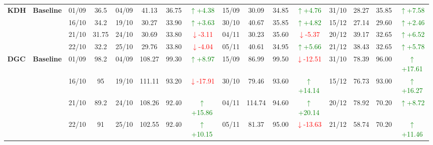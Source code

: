 \documentclass{ieeeaccess}
\begin{document}
{\begin{longtable}{llcc|cccc|cccc|cccc}
\multirow{4}{*}{\textbf{KDH}}
& \textbf{Baseline}
& 01/09 & 36.5 & 04/09 & 41.13 & 36.75 & \textcolor{green}{\(\uparrow\)+4.38} & 15/09 & 30.09 & 34.85 & \textcolor{green}{\(\uparrow\)+4.76} & 31/10 & 28.27 & 35.85 & \textcolor{green}{\(\uparrow\)+7.58} \\
& & 16/10 & 34.2 & 19/10 & 30.27 & 33.90 & \textcolor{green}{\(\uparrow\)+3.63} & 30/10 & 40.67 & 35.85 & \textcolor{green}{\(\uparrow\)+4.82} & 15/12 & 27.14 & 29.60 & \textcolor{green}{\(\uparrow\)+2.46} \\
& & 21/10 & 31.75 & 24/10 & 30.69 & 33.80 & \textcolor{red}{\(\downarrow\)-3.11} & 04/11 & 30.23 & 35.60 & \textcolor{red}{\(\downarrow\)-5.37} & 20/12 & 39.17 & 32.65 & \textcolor{green}{\(\uparrow\)+6.52} \\
& & 22/10 & 32.2 & 25/10 & 29.76 & 33.80 & \textcolor{red}{\(\downarrow\)-4.04} & 05/11 & 40.61 & 34.95 & \textcolor{green}{\(\uparrow\)+5.66} & 21/12 & 38.43 & 32.65 & \textcolor{green}{\(\uparrow\)+5.78} \\
\midrule

\multirow{4}{*}{\textbf{DGC}}
& \textbf{Baseline}
& 01/09 & 98.2 & 04/09 & 108.27 & 99.30 & \textcolor{green}{\(\uparrow\)+8.97} & 15/09 & 86.99 & 99.50 & \textcolor{red}{\(\downarrow\)-12.51} & 31/10 & 78.39 & 96.00 & \textcolor{green}{\(\uparrow\)+17.61} \\
& & 16/10 & 95 & 19/10 & 111.11 & 93.20 & \textcolor{red}{\(\downarrow\)-17.91} & 30/10 & 79.46 & 93.60 & \textcolor{green}{\(\uparrow\)+14.14} & 15/12 & 76.73 & 93.00 & \textcolor{green}{\(\uparrow\)+16.27} \\
& & 21/10 & 89.2 & 24/10 & 108.26 & 92.40 & \textcolor{green}{\(\uparrow\)+15.86} & 04/11 & 114.74 & 94.60 & \textcolor{green}{\(\uparrow\)+20.14} & 20/12 & 78.92 & 70.20 & \textcolor{green}{\(\uparrow\)+8.72} \\
& & 22/10 & 91 & 25/10 & 102.55 & 92.40 & \textcolor{green}{\(\uparrow\)+10.15} & 05/11 & 81.37 & 95.00 & \textcolor{red}{\(\downarrow\)-13.63} & 21/12 & 58.74 & 70.20 & \textcolor{green}{\(\uparrow\)+11.46} \\
\midrule


\end{longtable}}
\end{document}
